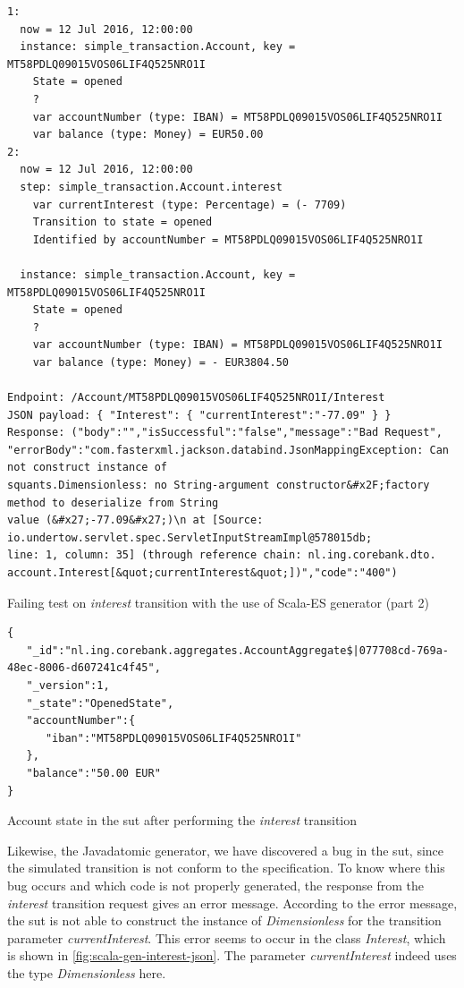 \begin{sourcecode}[h!]
\begin{lstlisting}[]
1:
  now = 12 Jul 2016, 12:00:00
  instance: simple_transaction.Account, key = MT58PDLQ09015VOS06LIF4Q525NRO1I
    State = opened
    ?
    var accountNumber (type: IBAN) = MT58PDLQ09015VOS06LIF4Q525NRO1I
    var balance (type: Money) = EUR50.00
2:
  now = 12 Jul 2016, 12:00:00
  step: simple_transaction.Account.interest
    var currentInterest (type: Percentage) = (- 7709)
    Transition to state = opened
    Identified by accountNumber = MT58PDLQ09015VOS06LIF4Q525NRO1I

  instance: simple_transaction.Account, key = MT58PDLQ09015VOS06LIF4Q525NRO1I
    State = opened
    ?
    var accountNumber (type: IBAN) = MT58PDLQ09015VOS06LIF4Q525NRO1I
    var balance (type: Money) = - EUR3804.50

Endpoint: /Account/MT58PDLQ09015VOS06LIF4Q525NRO1I/Interest
JSON payload: { "Interest": { "currentInterest":"-77.09" } }
Response: ("body":"","isSuccessful":"false","message":"Bad Request",
"errorBody":"com.fasterxml.jackson.databind.JsonMappingException: Can not construct instance of
squants.Dimensionless: no String-argument constructor&#x2F;factory method to deserialize from String
value (&#x27;-77.09&#x27;)\n at [Source: io.undertow.servlet.spec.ServletInputStreamImpl@578015db;
line: 1, column: 35] (through reference chain: nl.ing.corebank.dto.
account.Interest[&quot;currentInterest&quot;])","code":"400")
\end{lstlisting}
\caption{Failing test on \textit{interest} transition with the use of Scala-ES generator (part 2)}\label{fig:result-scalaes-interest-p2}
\end{sourcecode}
\FloatBarrier

\begin{sourcecode}[h!]
\begin{lstlisting}[]
{
   "_id":"nl.ing.corebank.aggregates.AccountAggregate$|077708cd-769a-48ec-8006-d607241c4f45",
   "_version":1,
   "_state":"OpenedState",
   "accountNumber":{
      "iban":"MT58PDLQ09015VOS06LIF4Q525NRO1I"
   },
   "balance":"50.00 EUR"
}
\end{lstlisting}
\caption{Account state in the \gls{sut} after performing the \textit{interest} transition}\label{fig:interest-opened-account-scalaes-json}
\end{sourcecode}
\FloatBarrier

Likewise, the Javadatomic generator, we have discovered a bug in the \gls{sut}, since
the simulated transition is not conform to the specification. To know where this
bug occurs and which code is not properly generated, the response from the
\textit{interest} transition request gives an error message. According to the error
message, the \gls{sut} is not able to construct the instance of \textit{Dimensionless}
for the transition parameter \textit{currentInterest}. This error seems to occur
in the class \textit{Interest}, which is shown in
\autoref{fig:scala-gen-interest-json}. The parameter \textit{currentInterest}
indeed uses the type \textit{Dimensionless} here.

